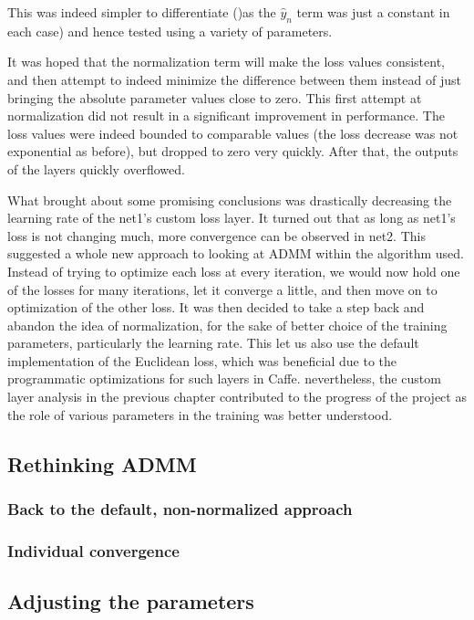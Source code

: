 \documentclass[a4paper, 12pt]{article}
\numberwithin{equation}{section}
\begin{document}
	This was indeed simpler to differentiate ()as the $\hat{y}_n$ term was just a constant in each case) and hence tested using a variety of parameters.
	
	It was hoped that the normalization term will make the loss values consistent, and then attempt to indeed minimize the difference between them instead of just bringing the absolute parameter values close to zero. This first attempt at normalization did not result in a significant improvement in performance. The loss values were indeed bounded to comparable values (the loss decrease was not exponential as before), but dropped to zero very quickly. After that, the outputs of the layers quickly overflowed.
	
	What brought about some promising conclusions was drastically decreasing the learning rate of the net1's custom loss layer. It turned out that as long as net1's loss is not changing much, more convergence can be observed in net2. This suggested a whole new approach to looking at ADMM within the algorithm used. Instead of trying to optimize each loss at every iteration, we would now hold one of the losses for many iterations, let it converge a little, and then move on to optimization of the other loss. It was then decided to take a step back and abandon the idea of normalization, for the sake of better choice of the training parameters, particularly the learning rate. This let us also use the default implementation of the Euclidean loss, which was beneficial due to the programmatic optimizations for such layers in Caffe. nevertheless, the custom layer analysis in the previous chapter  contributed to the progress of the project as the role of various parameters in the training was better understood.
	
	\subsection{Rethinking ADMM}

	\subsubsection{Back to the default, non-normalized approach}
	
	\subsubsection{Individual convergence}
	
	\subsection{Adjusting the parameters}
	
\end{document}
